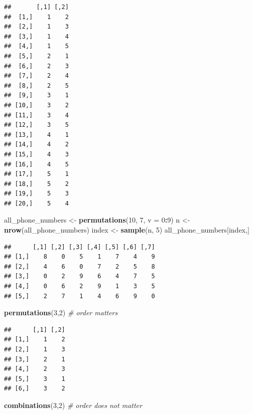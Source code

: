 \documentclass[
]{article}
\newenvironment{Shaded}{\begin{snugshade}}{\end{snugshade}}
\newcommand{\CommentTok}[1]{\textcolor[rgb]{0.56,0.35,0.01}{\textit{#1}}}
\newcommand{\DataTypeTok}[1]{\textcolor[rgb]{0.13,0.29,0.53}{#1}}
\newcommand{\DecValTok}[1]{\textcolor[rgb]{0.00,0.00,0.81}{#1}}
\newcommand{\KeywordTok}[1]{\textcolor[rgb]{0.13,0.29,0.53}{\textbf{#1}}}
\newcommand{\NormalTok}[1]{#1}
\newcommand{\OperatorTok}[1]{\textcolor[rgb]{0.81,0.36,0.00}{\textbf{#1}}}
\newcommand{\StringTok}[1]{\textcolor[rgb]{0.31,0.60,0.02}{#1}}
\begin{document}
\begin{verbatim}
##       [,1] [,2]
##  [1,]    1    2
##  [2,]    1    3
##  [3,]    1    4
##  [4,]    1    5
##  [5,]    2    1
##  [6,]    2    3
##  [7,]    2    4
##  [8,]    2    5
##  [9,]    3    1
## [10,]    3    2
## [11,]    3    4
## [12,]    3    5
## [13,]    4    1
## [14,]    4    2
## [15,]    4    3
## [16,]    4    5
## [17,]    5    1
## [18,]    5    2
## [19,]    5    3
## [20,]    5    4
\end{verbatim}

\begin{Shaded}
\begin{Highlighting}[]
\NormalTok{all\_phone\_numbers \textless{}{-}}\StringTok{ }\KeywordTok{permutations}\NormalTok{(}\DecValTok{10}\NormalTok{, }\DecValTok{7}\NormalTok{, }\DataTypeTok{v =} \DecValTok{0}\OperatorTok{:}\DecValTok{9}\NormalTok{)}
\NormalTok{n \textless{}{-}}\StringTok{ }\KeywordTok{nrow}\NormalTok{(all\_phone\_numbers)}
\NormalTok{index \textless{}{-}}\StringTok{ }\KeywordTok{sample}\NormalTok{(n, }\DecValTok{5}\NormalTok{)}
\NormalTok{all\_phone\_numbers[index,]}
\end{Highlighting}
\end{Shaded}

\begin{verbatim}
##      [,1] [,2] [,3] [,4] [,5] [,6] [,7]
## [1,]    8    0    5    1    7    4    9
## [2,]    4    6    0    7    2    5    8
## [3,]    0    2    9    6    4    7    5
## [4,]    0    6    2    9    1    3    5
## [5,]    2    7    1    4    6    9    0
\end{verbatim}

\begin{Shaded}
\begin{Highlighting}[]
\KeywordTok{permutations}\NormalTok{(}\DecValTok{3}\NormalTok{,}\DecValTok{2}\NormalTok{)    }\CommentTok{\# order matters}
\end{Highlighting}
\end{Shaded}

\begin{verbatim}
##      [,1] [,2]
## [1,]    1    2
## [2,]    1    3
## [3,]    2    1
## [4,]    2    3
## [5,]    3    1
## [6,]    3    2
\end{verbatim}

\begin{Shaded}
\begin{Highlighting}[]
\KeywordTok{combinations}\NormalTok{(}\DecValTok{3}\NormalTok{,}\DecValTok{2}\NormalTok{)    }\CommentTok{\# order does not matter}
\end{Highlighting}
\end{Shaded}
\end{document}

